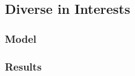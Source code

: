 \subsection{Diverse in Interests}\label{sec:diversity}
\subsubsection{Model}
\subsubsection{Results}


